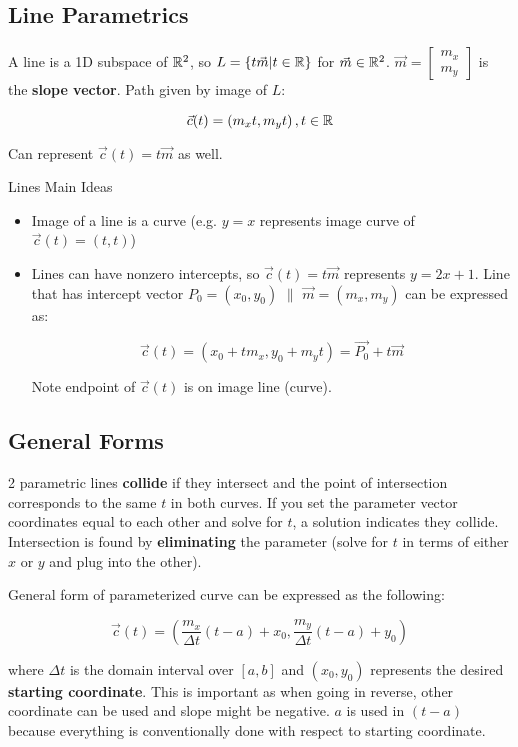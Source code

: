 \subsection{Line Parametrics}

A line is a 1D subspace of $\mathbb{R}^2$, so $L=\{t\vec{m}|t\in\mathbb{R}\}$ for $\vec{m}\in\mathbb{R}^2$.
$\vec{m}=\begin{bmatrix}m_x\\m_y\end{bmatrix}$ is the \textbf{slope vector}.
Path given by image of $L$: 

\[\vec{c}(t)=\left(m_{x} t, m_{y} t\right),t\in\mathbb{R}\]

Can represent $\vec{c}(t)=t\vec{m}$ as well.\newline

\noindent
Lines Main Ideas
\begin{itemize}
    \item Image of a line is a curve (e.g. $y=x$ represents image curve of $\vec{c}(t)=(t,t)$)
    \item Lines can have nonzero intercepts, so $\vec{c}(t)=t\vec{m}$ represents $y=2x+1$. Line
    that has intercept vector $P_0=(x_0,y_0)$ $\parallel$ $\vec{m}=(m_x,m_y)$ can be expressed as:

    \[\boxed{\vec{c}(t)=(x_0+tm_x, y_0+m_yt)=\vec{P_0}+t\vec{m}}\]

    Note endpoint of $\vec{c}(t)$ is on image line (curve).

\end{itemize}

\subsection{General Forms}

2 parametric lines \textbf{collide} if they intersect and the point of intersection corresponds
to the same $t$ in both curves. If you set the parameter vector coordinates equal to each
other and solve for $t$, a solution indicates they collide. Intersection is found by \textbf{eliminating}
the parameter (solve for $t$ in terms of either $x$ or $y$ and plug into the other).\newline

\noindent
General form of parameterized curve can be expressed as the following:

\[\boxed{\vec{c}(t)=(\frac{m_x}{\Delta t}(t-a)+x_0,\frac{m_y}{\Delta t}(t-a)+y_0)}\]

where $\Delta t$ is the domain interval over $[a,b]$ and $(x_0,y_0)$ represents the desired \textbf{starting coordinate}.
This is important as when going in reverse, other coordinate can be used and slope might be negative.
$a$ is used in $(t-a)$ because everything is conventionally done with respect to starting coordinate.

